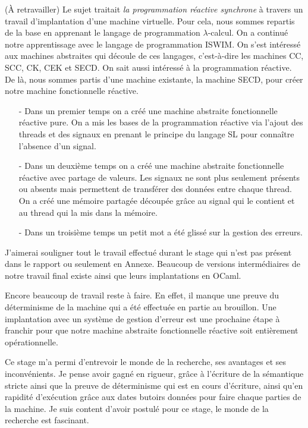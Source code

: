 \documentclass[10pt,a4paper]{report}
\begin{document}
	(À retravailler)
	Le sujet traitait \textit{la programmation réactive synchrone} à travers un travail d'implantation d'une machine virtuelle. Pour cela, nous sommes repartis de la base en apprenant le langage de programmation $\lambda$-calcul. On a continué notre apprentissage avec le langage de programmation ISWIM. On s'est intéressé aux machines abstraites qui découle de ces langages, c'est-à-dire les machines CC, SCC, CK, CEK et SECD. On sait aussi intéressé à la programmation réactive. De là, nous sommes partis d'une machine existante, la machine SECD, pour créer notre machine fonctionnelle réactive.
	\begin{itemize}
		\item[-] Dans un premier temps on a créé une machine abstraite fonctionnelle réactive pure. On a mis les bases de la programmation réactive via l'ajout des threads et des signaux en prenant le principe du langage SL pour connaître l'absence d'un signal. 
		\item[-]Dans un deuxième temps on a créé une machine abstraite fonctionnelle réactive avec partage de valeurs. Les signaux ne sont plus seulement présents ou absents mais permettent de transférer des données entre chaque thread. On a créé une mémoire partagée découpée grâce au signal qui le contient et au thread qui la mis dans la mémoire.
		\item[-] Dans un troisième temps un petit mot a été glissé sur la gestion des erreurs. 
	\end{itemize}
	\medbreak
	
	J'aimerai souligner tout le travail effectué durant le stage qui n'est pas présent dans le rapport ou seulement en Annexe. Beaucoup de versions intermédiaires de notre travail final existe ainsi que leurs implantations en OCaml.
	\medbreak
	
	Encore beaucoup de travail reste à faire. En effet, il manque une preuve du déterminisme de la machine qui a été effectuée en partie au brouillon. Une implantation avec un système de gestion d'erreur est une prochaine étape à franchir pour que notre machine abstraite fonctionnelle réactive soit entièrement opérationnelle.
	\medbreak
	
	Ce stage m'a permi d'entrevoir le monde de la recherche, ses avantages et ses inconvénients. Je pense avoir gagné en rigueur, grâce à l'écriture de la sémantique stricte ainsi que la preuve de déterminisme qui est en cours d'écriture, ainsi qu'en rapidité d'exécution grâce aux dates butoirs données pour faire chaque parties de la machine. Je suis content d'avoir postulé pour ce stage, le monde de la recherche est fascinant.
	
\end{document}

